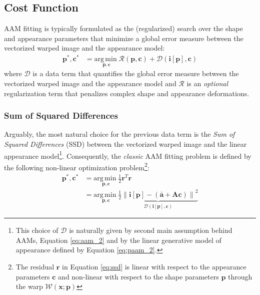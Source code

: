 \subsection{Cost Function}
\label{sec:cost_function}

AAM fitting is typically formulated as the (regularized) search over the shape and appearance parameters that minimize a global error measure between the vectorized warped image and the appearance model:
\begin{equation}
    \begin{aligned}
        \mathbf{p}^*, \mathbf{c}^* & = \underset{\mathbf{p}, \mathbf{c}} {\mathrm{arg\, min\;}} \mathcal{R} (\mathbf{p}, \mathbf{c}) + \mathcal{D} (\mathbf{i}[\mathbf{p}], \mathbf{c}) 
        \end{aligned}
    \label{eq:aam_fitting}
\end{equation}
where $\mathcal{D}$ is a data term that quantifies the global error measure between the vectorized warped image and the appearance model and $\mathcal{R}$ is an \emph{optional} regularization term that penalizes complex shape and appearance deformations.


\subsubsection{Sum of Squared Differences}
\label{sec:rssd}

Arguably, the most natural choice for the previous data term is the \emph{Sum of Squared Differences} (SSD) between the vectorized warped image and the linear appearance model\footnote{This choice of $\mathcal{D}$ is naturally given by second main assumption behind AAMs, Equation \ref{eq:aam_2} and by the linear generative model of appearance defined by Equation \ref{eq:paam_2}.}. Consequently, the \emph{classic} AAM fitting problem is defined by the following non-linear optimization problem\footnote{The residual $\mathbf{r}$ in Equation \ref{eq:ssd} is linear with respect to the appearance parameters $\mathbf{c}$ and non-linear with respect to the shape parameters $\mathbf{p}$ through the warp $\mathcal{W}(\mathbf{x}; \mathbf{p})$}:
\begin{equation}
    \begin{aligned}
        \mathbf{p}^*, \mathbf{c}^* & = \underset{\mathbf{p}, \mathbf{c}} {\mathrm{arg\, min\;}} \frac{1}{2} \mathbf{r}^T\mathbf{r}
        \\
        & = \underset{\mathbf{p}, \mathbf{c}} {\mathrm{arg\, min\;}} 
        \underbrace{\frac{1}{2} \left\| \mathbf{i}[\mathbf{p}] - \left( \bar{\mathbf{a}} + \mathbf{A} \mathbf{c} \right) \right\|^2}_{\mathcal{D} (\mathbf{i}[\mathbf{p}], \mathbf{c})} 
    \end{aligned}
    \label{eq:ssd}
\end{equation}

